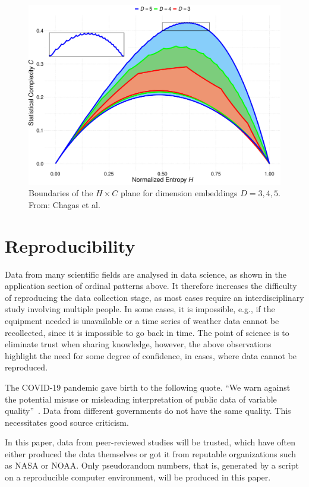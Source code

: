 \begin{figure}[hbt]
	\centering
	\includegraphics[width=.7\linewidth]{../../Figures/BoundariesPlot}
	\caption{Boundaries of the $H\times C$ plane for dimension embeddings $D=3,4,5$. From: Chagas et al.~\cite{WhiteNoiseTestfromOrdinalPatternsintheEntropyComplexityPlane}}\label{fig:Boundaries}
\end{figure}

\section{Reproducibility}

Data from many scientific fields are analysed in data science, as shown in the application section of ordinal patterns above. 
It therefore increases the difficulty of reproducing the data collection stage, as most cases require an interdisciplinary study involving multiple people. 
In some cases, it is impossible, e.g., if the equipment needed is unavailable or a time series of weather data cannot be recollected, since it is impossible to go back in time. 
The point of science is to eliminate trust when sharing knowledge, however, the above observations highlight the need for some degree of confidence, in cases, where data cannot be reproduced. 

The COVID-19 pandemic gave birth to the following quote. 
``We warn against the potential misuse or misleading interpretation of public data of variable quality''~\cite{Struelens2021}. 
Data from different governments do not have the same quality. 
This necessitates good source criticism.
 
In this paper, data from peer-reviewed studies will be trusted, which have often either produced the data themselves or got it from reputable organizations such as NASA or NOAA. 
Only pseudorandom numbers, that is, generated by a script on a reproducible computer environment, will be produced in this paper.

